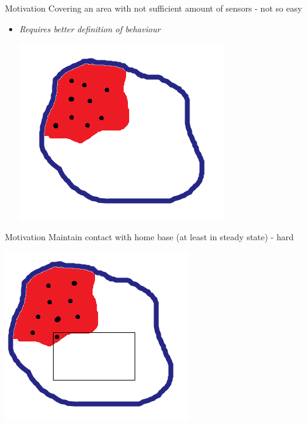 \documentclass[t]{beamer}
\begin{document}
\begin{frame}[label=motivation2]{Motivation}
Covering an area with not sufficient amount of sensors - not so easy
\begin{itemize}
\item \textit{Requires better definition of behaviour}
\begin{center}
\includegraphics[scale=0.4]{motivation-figures-not-enough.png}
\end{center}
\end{itemize}

\end{frame}

\begin{frame}[label=motivation3]{Motivation}
Maintain contact with home base (at least in steady state) - hard
\begin{center}
\includegraphics[scale=0.4]{motivation-figures-constraint.png}
\end{center}
\end{frame}
\end{document}
